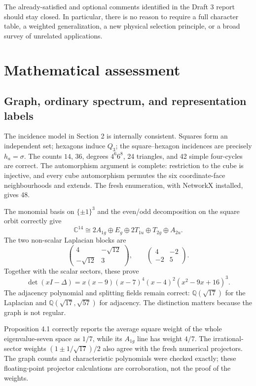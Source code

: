 \documentclass[11pt,a4paper]{article}
\newcommand{\Q}{\mathbb Q}
\newcommand{\C}{\mathbb C}
\begin{document}
\normalsize
The already-satisfied and optional comments identified in the Draft 3 report should stay closed. In particular, there is no reason to require a full character table, a weighted generalization, a new physical selection principle, or a broad survey of unrelated applications.

\section{Mathematical assessment}
\subsection{Graph, ordinary spectrum, and representation labels}
The incidence model in Section 2 is internally consistent. Squares form an independent set; hexagons induce $Q_3$; the square--hexagon incidences are precisely $h_a=\sigma$. The counts $14$, $36$, degrees $4^6 6^8$, 24 triangles, and 42 simple four-cycles are correct. The automorphism argument is complete: restriction to the cube is injective, and every cube automorphism permutes the six coordinate-face neighbourhoods and extends. The fresh enumeration, with NetworkX installed, gives 48.

The monomial basis on $\{\pm1\}^3$ and the even/odd decomposition on the square orbit correctly give
\[
\C^{14}\cong 2A_{1g}\oplus E_g\oplus2T_{1u}\oplus T_{2g}\oplus A_{2u}.
\]
The two non-scalar Laplacian blocks are
\[
\begin{pmatrix}4&-\sqrt{12}\\-\sqrt{12}&3\end{pmatrix},\qquad
\begin{pmatrix}4&-2\\-2&5\end{pmatrix}.
\]
Together with the scalar sectors, these prove
\[
\det(xI-\Delta)=x(x-9)(x-7)^4(x-4)^2(x^2-9x+16)^3.
\]
The adjacency polynomial and splitting fields remain correct: $\Q(\sqrt{17})$ for the Laplacian and $\Q(\sqrt{17},\sqrt{57})$ for adjacency. The distinction matters because the graph is not regular.

Proposition 4.1 correctly reports the average square weight of the whole eigenvalue-seven space as $1/7$, while its $A_{1g}$ line has weight $4/7$. The irrational-sector weights $(1\pm1/\sqrt{17})/2$ also agree with the fresh numerical projectors. The graph counts and characteristic polynomials were checked exactly; these floating-point projector calculations are corroboration, not the proof of the weights.
\end{document}
